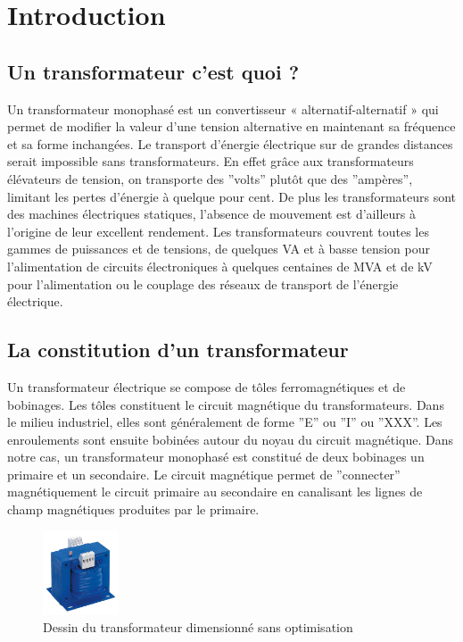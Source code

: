 \section{Introduction}


\subsection{Un transformateur c'est quoi ? }

	Un transformateur monophasé est un convertisseur « alternatif-alternatif » qui permet de modifier la valeur d’une tension alternative en maintenant sa fréquence et sa forme inchangées. Le transport d'énergie électrique sur de grandes distances serait impossible sans transformateurs. En effet grâce aux transformateurs élévateurs de tension, on transporte des ''volts'' plutôt que des ''ampères'', limitant les pertes d’énergie à quelque pour cent. De plus les transformateurs sont des machines électriques statiques, l'absence de mouvement est d'ailleurs à l'origine de leur excellent rendement. Les transformateurs couvrent toutes les gammes de puissances et de tensions, de quelques VA et à basse tension pour l’alimentation de circuits électroniques à quelques centaines de MVA et de kV pour l’alimentation ou le couplage des réseaux de transport de l’énergie électrique. %

\subsection{La constitution d'un transformateur}

	Un transformateur électrique se compose de tôles ferromagnétiques et de bobinages. Les tôles constituent le circuit magnétique du transformateurs. Dans le milieu industriel, elles sont généralement de forme ''E'' ou ''I'' ou ''XXX''.
 Les enroulements sont ensuite bobinées autour du noyau du circuit magnétique. Dans notre cas, un transformateur monophasé est constitué de deux bobinages un primaire et un secondaire. 
Le circuit magnétique permet de ''connecter''  magnétiquement le circuit primaire au secondaire en canalisant les lignes de champ magnétiques produites par le primaire.

\begin{figure}[ht]
	\begin{center}
	\includegraphics[width=0.2\textwidth]{images/TP_intro_transfo}
	\caption{Dessin du transformateur dimensionné sans optimisation}\label{img:dessinTransfoCarre}
	\end{center}
\end{figure}
\FloatBarrier 


